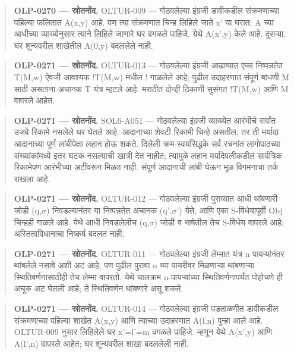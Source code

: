 \begin{quote}\small\textbf{OLP-0270 — स्रोतनोंद.} OLTUR-009 — गोठवलेल्या इंग्रजी डावीकडील संक्रमणाच्या पहिल्या फलितात A(x,y) आहे. पण त्या संक्रमणात चिन्ह लिहिले जाते x' या घरात; A च्या आधीच्या व्याख्येनुसार त्याने लिहिले जाणारे घर वगळले पाहिजे. येथे A(x',y) केले आहे. दुसऱ्या, घर शून्यवरील शाखेतील A(0,y) बदललेले नाही.\end{quote}
\begin{quote}\small\textbf{OLP-0271 — स्रोतनोंद.} OLTUR-013 — गोठवलेल्या इंग्रजी आढाव्यात एका निष्पन्नतेत T(M,w) ऐवजी आवश्यक {!}T(M,w) मधील {!} गाळलेले आहे; पुढील उदाहरणात संपूर्ण बांधणी M साठी असताना अचानक T यंत्र म्हटले आहे. मराठीत दोन्ही ठिकाणी सुसंगत {!}T(M,w) आणि M वापरले आहेत.\end{quote}
\begin{quote}\small\textbf{OLP-0271 — स्रोतनोंद.} SOL6-A051 — गोठवलेल्या इंग्रजी व्याख्येत आरंभीचे सर्वांत उजवे रिकामे नसलेले घर घेतले आहे. आदानाच्या शेवटी रिकामी चिन्हे असतील, तर ती मर्यादा आदानाच्या पूर्ण लांबीपेक्षा लहान होऊ शकते. दिलेली क्रम-स्वयंसिद्धके सर्व रचनांत लागोपाठच्या संख्यांकांमध्ये इतर घटक नसल्याची खात्री देत नाहीत; त्यामुळे लहान मर्यादेपलीकडील सार्वत्रिक रिकामेपण आरंभीच्या अटींवरून मिळत नाही. संपूर्ण आदानाची लांबी घेऊन मूळ विगमनाचा तर्क राखला आहे.\end{quote}
\begin{quote}\small\textbf{OLP-0271 — स्रोतनोंद.} OLTUR-012 — गोठवलेल्या इंग्रजी पुराव्यात आधी थांबणारी जोडी (q,\ensuremath{\sigma}) निवडल्यानंतर या निष्पन्नतेत अचानक (q',\ensuremath{\sigma}') येते, आणि एका S-विधेयापूर्वी Obj चिन्हही गाळले आहे. येथे आधी निवडलेलीच (q,\ensuremath{\sigma}) जोडी व भाषेतील तेच S-विधेय वापरले आहे; अस्तित्वविधानाचा निष्कर्ष बदलत नाही.\end{quote}
\begin{quote}\small\textbf{OLP-0271 — स्रोतनोंद.} OLTUR-011 — गोठवलेल्या इंग्रजी लेम्मात यंत्र n पायऱ्यांनंतर थांबलेले नसावे अशी अट आहे, पण पुढील पुरावा n व्या पायरीवर मिळणाऱ्या थांबणाऱ्या स्थितिवर्णनासाठीही तेच लेम्मा वापरतो. येथे चालक्रम n-पायऱ्यांच्या स्थितिवर्णनापर्यंत पोहोचणे ही अचूक अट घेतली आहे; ते स्थितिवर्णन थांबणारे असू शकते.\end{quote}
\begin{quote}\small\textbf{OLP-0271 — स्रोतनोंद.} OLTUR-014 — गोठवलेल्या इंग्रजी पडताळणीत डावीकडील संक्रमणाच्या पहिल्या शाखेत A(x,y) आणि त्याच्या उदाहरणात A(l,n) पुन्हा आले आहे. OLTUR-009 नुसार लिहिलेले घर x'=l'=m वगळले पाहिजे. म्हणून येथे A(x',y) आणि A(l',n) वापरले आहेत; घर शून्यवरील शाखा बदललेली नाही.\end{quote}
